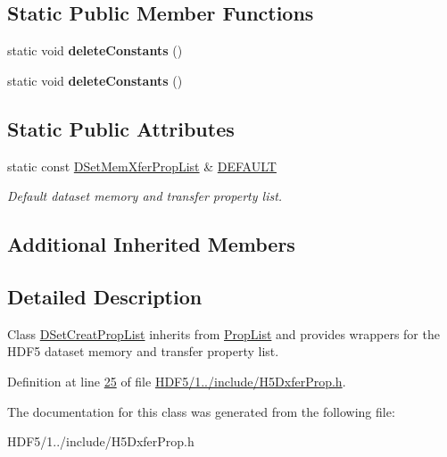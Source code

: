 \subsection*{Static Public Member Functions}
\begin{DoxyCompactItemize}
\item 
\mbox{\label{class_h5_1_1_d_set_mem_xfer_prop_list_afc3b4059fdc90c302851e116e2d99848}} 
static void {\bfseries delete\+Constants} ()
\item 
\mbox{\label{class_h5_1_1_d_set_mem_xfer_prop_list_afc3b4059fdc90c302851e116e2d99848}} 
static void {\bfseries delete\+Constants} ()
\end{DoxyCompactItemize}
\subsection*{Static Public Attributes}
\begin{DoxyCompactItemize}
\item 
\mbox{\label{class_h5_1_1_d_set_mem_xfer_prop_list_ae69bf0ec7bccd4bb793ffe1ff770d8c4}} 
static const \hyperlink{class_h5_1_1_d_set_mem_xfer_prop_list}{D\+Set\+Mem\+Xfer\+Prop\+List} \& \hyperlink{class_h5_1_1_d_set_mem_xfer_prop_list_ae69bf0ec7bccd4bb793ffe1ff770d8c4}{D\+E\+F\+A\+U\+LT}
\begin{DoxyCompactList}\small\item\em Default dataset memory and transfer property list. \end{DoxyCompactList}\end{DoxyCompactItemize}
\subsection*{Additional Inherited Members}


\subsection{Detailed Description}
Class \hyperlink{class_h5_1_1_d_set_creat_prop_list}{D\+Set\+Creat\+Prop\+List} inherits from \hyperlink{class_h5_1_1_prop_list}{Prop\+List} and provides wrappers for the H\+D\+F5 dataset memory and transfer property list. 

Definition at line \hyperlink{_h_d_f5_21_810_81_2include_2_h5_dxfer_prop_8h_source_l00025}{25} of file \hyperlink{_h_d_f5_21_810_81_2include_2_h5_dxfer_prop_8h_source}{H\+D\+F5/1../include/\+H5\+Dxfer\+Prop.\+h}.



The documentation for this class was generated from the following file\+:\begin{DoxyCompactItemize}
\item 
H\+D\+F5/1../include/\+H5\+Dxfer\+Prop.\+h\end{DoxyCompactItemize}
